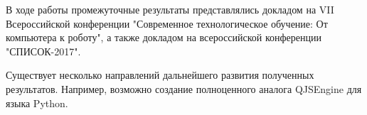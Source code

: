 \documentclass[14pt]{matmex-diploma-custom}
\begin{document}
В ходе работы промежуточные результаты представлялись докладом на VII Всероссийской конференции "Современное технологическое обучение: От компьютера к роботу", а также докладом на всероссийской конференции "СПИСОК-2017".

Существует несколько направлений дальнейшего развития полученных результатов. Например, возможно создание полноценного аналога QJSEngine для языка Python.

\setmonofont[Mapping=tex-text]{CMU Typewriter Text}


\end{document}
